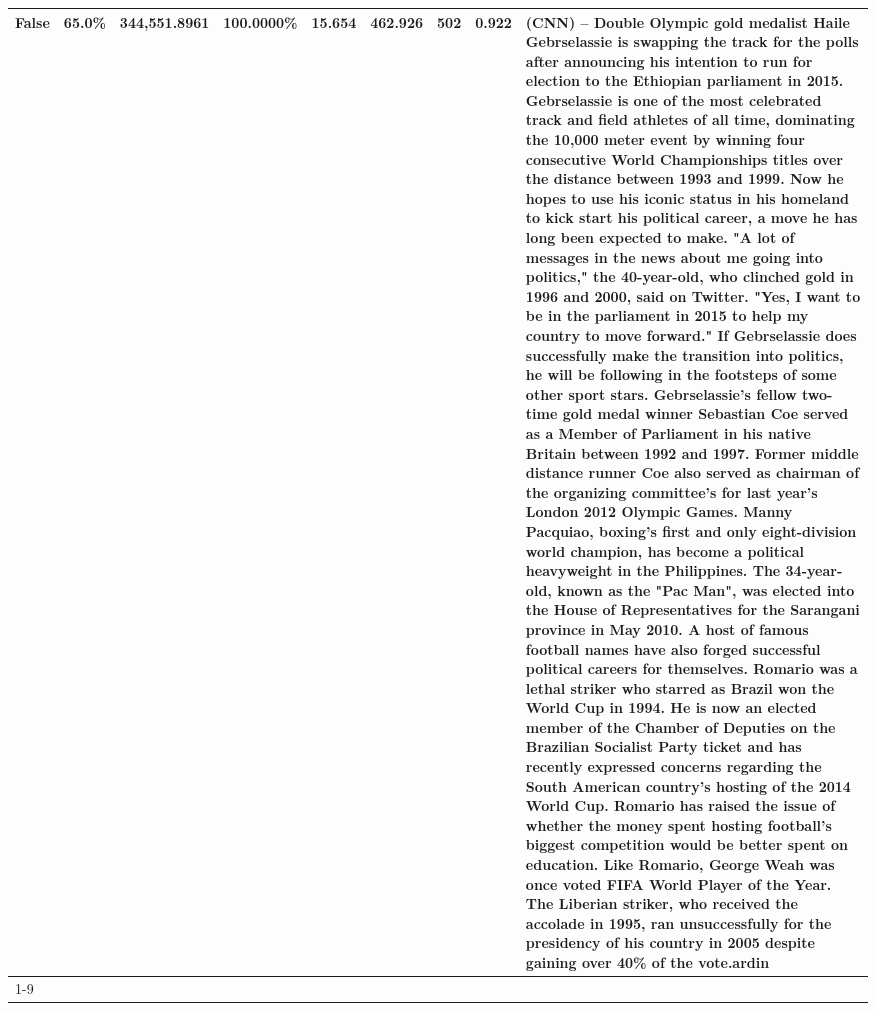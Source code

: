 \begin{table}[H]
{\begin{tabular}{lllrlllll}
False & 65.0\% & 344,551.8961 & \bfseries \color{red} 100.0000\% & 15.654 & 462.926 & 502 & 0.922 & (CNN) -- Double Olympic gold medalist Haile Gebrselassie is swapping the track for the polls after announcing his intention to run for election to the Ethiopian parliament in 2015. Gebrselassie is one of the most celebrated track and field athletes of all time, dominating the 10,000 meter event by winning four consecutive World Championships titles over the distance between 1993 and 1999. Now he hopes to use his iconic status in his homeland to kick start his political career, a move he has long been expected to make. "A lot of messages in the news about me going into politics," the 40-year-old, who clinched gold in 1996 and 2000, said on Twitter. "Yes, I want to be in the parliament in 2015 to help my country to move forward." If Gebrselassie does successfully make the transition into politics, he will be following in the footsteps of some other sport stars. Gebrselassie's fellow two-time gold medal winner Sebastian Coe served as a Member of Parliament in his native Britain between 1992 and 1997. Former middle distance runner Coe also served as chairman of the organizing committee's for last year's London 2012 Olympic Games. Manny Pacquiao, boxing's first and only eight-division world champion, has become a political heavyweight in the Philippines. The 34-year-old, known as the "Pac Man", was elected into the House of Representatives for the Sarangani province in May 2010. A host of famous football names have also forged successful political careers for themselves. Romario was a lethal striker who starred as Brazil won the World Cup in 1994. He is now an elected member of the Chamber of Deputies on the Brazilian Socialist Party ticket and has recently expressed concerns regarding the South American country's hosting of the 2014 World Cup. Romario has raised the issue of whether the money spent hosting football's biggest competition would be better spent on education. Like Romario, George Weah was once voted FIFA World Player of the Year. The Liberian striker, who received the accolade in 1995, ran unsuccessfully for the presidency of his country in 2005 despite gaining over 40\% of the vote.ardin \\
\cline{1-9}

\end{tabular}}
\end{table}
